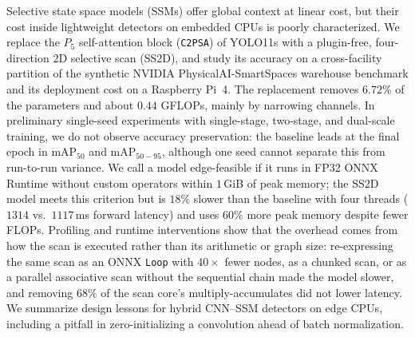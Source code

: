 Selective state space models (SSMs) offer global context at linear cost, but their cost inside lightweight detectors on embedded CPUs is poorly characterized. We replace the $P_5$ self-attention block (\texttt{C2PSA}) of YOLO11s with a plugin-free, four-direction 2D selective scan (SS2D), and study its accuracy on a cross-facility partition of the synthetic NVIDIA PhysicalAI-SmartSpaces warehouse benchmark and its deployment cost on a Raspberry Pi~4. The replacement removes $6.72\%$ of the parameters and about $0.44$ GFLOPs, mainly by narrowing channels. In preliminary single-seed experiments with single-stage, two-stage, and dual-scale training, we do not observe accuracy preservation: the baseline leads at the final epoch in $\text{mAP}_{50}$ and $\text{mAP}_{50-95}$, although one seed cannot separate this from run-to-run variance. We call a model edge-feasible if it runs in FP32 ONNX Runtime without custom operators within $1$\,GiB of peak memory; the SS2D model meets this criterion but is $18\%$ slower than the baseline with four threads ($1314$ vs.\ $1117$\,ms forward latency) and uses $60\%$ more peak memory despite fewer FLOPs. Profiling and runtime interventions show that the overhead comes from how the scan is executed rather than its arithmetic or graph size: re-expressing the same scan as an ONNX \texttt{Loop} with $40\times$ fewer nodes, as a chunked scan, or as a parallel associative scan without the sequential chain made the model slower, and removing $68\%$ of the scan core's multiply-accumulates did not lower latency. We summarize design lessons for hybrid CNN--SSM detectors on edge CPUs, including a pitfall in zero-initializing a convolution ahead of batch normalization.
